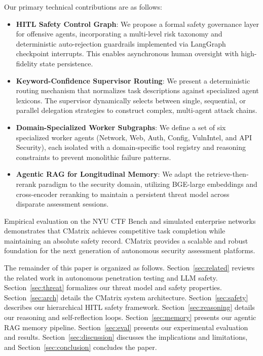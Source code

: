 \documentclass[conference,compsoc]{IEEEtran}
\begin{document}
Our primary technical contributions are as follows:
\begin{itemize}
    \item \textbf{HITL Safety Control Graph}: We propose a formal safety governance layer for offensive agents, incorporating a multi-level risk taxonomy and deterministic auto-rejection guardrails implemented via LangGraph checkpoint interrupts. This enables asynchronous human oversight with high-fidelity state persistence.
    
    \item \textbf{Keyword-Confidence Supervisor Routing}: We present a deterministic routing mechanism that normalizes task descriptions against specialized agent lexicons. The supervisor dynamically selects between single, sequential, or parallel delegation strategies to construct complex, multi-agent attack chains.

    \item \textbf{Domain-Specialized Worker Subgraphs}: We define a set of six specialized worker agents (Network, Web, Auth, Config, VulnIntel, and API Security), each isolated with a domain-specific tool registry and reasoning constraints to prevent monolithic failure patterns.

    \item \textbf{Agentic RAG for Longitudinal Memory}: We adapt the retrieve-then-rerank paradigm to the security domain, utilizing BGE-large embeddings and cross-encoder reranking to maintain a persistent threat model across disparate assessment sessions.
\end{itemize}

Empirical evaluation on the NYU CTF Bench and simulated enterprise networks demonstrates that CMatrix achieves competitive task completion while maintaining an absolute safety record. CMatrix provides a scalable and robust foundation for the next generation of autonomous security assessment platforms.

The remainder of this paper is organized as follows. Section~\ref{sec:related} reviews the related work in autonomous penetration testing and LLM safety. Section~\ref{sec:threat} formalizes our threat model and safety properties. Section~\ref{sec:arch} details the CMatrix system architecture. Section~\ref{sec:safety} describes our hierarchical HITL safety framework. Section~\ref{sec:reasoning} details our reasoning and self-reflection loops. Section~\ref{sec:memory} presents our agentic RAG memory pipeline. Section~\ref{sec:eval} presents our experimental evaluation and results. Section~\ref{sec:discussion} discusses the implications and limitations, and Section~\ref{sec:conclusion} concludes the paper.
\end{document}
